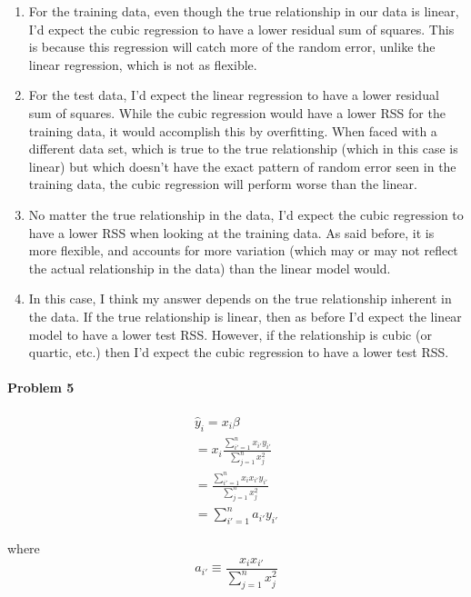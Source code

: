 \documentclass[]{article}
\providecommand{\tightlist}{%
  \setlength{\itemsep}{0pt}\setlength{\parskip}{0pt}}
\let\oldparagraph\paragraph
\renewcommand{\paragraph}[1]{\oldparagraph{#1}\mbox{}}
\begin{document}
\begin{enumerate}
\def\labelenumi{\alph{enumi}.}
\tightlist
\item
  For the training data, even though the true relationship in our data
  is linear, I'd expect the cubic regression to have a lower residual
  sum of squares. This is because this regression will catch more of the
  random error, unlike the linear regression, which is not as flexible.
\item
  For the test data, I'd expect the linear regression to have a lower
  residual sum of squares. While the cubic regression would have a lower
  RSS for the training data, it would accomplish this by overfitting.
  When faced with a different data set, which is true to the true
  relationship (which in this case is linear) but which doesn't have the
  exact pattern of random error seen in the training data, the cubic
  regression will perform worse than the linear.
\item
  No matter the true relationship in the data, I'd expect the cubic
  regression to have a lower RSS when looking at the training data. As
  said before, it is more flexible, and accounts for more variation
  (which may or may not reflect the actual relationship in the data)
  than the linear model would.
\item
  In this case, I think my answer depends on the true relationship
  inherent in the data. If the true relationship is linear, then as
  before I'd expect the linear model to have a lower test RSS. However,
  if the relationship is cubic (or quartic, etc.) then I'd expect the
  cubic regression to have a lower test RSS.
\end{enumerate}

\newpage

\paragraph{Problem 5}\label{problem-5}

\begin{eqnarray} 
\hat{y}_i = x_i \beta \\
= x_i \frac{\sum_{i' = 1}^n x_{i'} y_{i'}}{\sum_{j=1}^n x_j ^2} \\
= \frac{\sum_{i'=1}^n x_i x_{i'}y_{i'}}{\sum_{j=1}^n x_j ^2} \\
= \sum_{i'=1}^n a_{i'} y_{i'}
\end{eqnarray}

where \[a_{i'} \equiv \frac{x_i x_{i'}}{\sum_{j=1} ^n x_j ^2}\]
\end{document}
